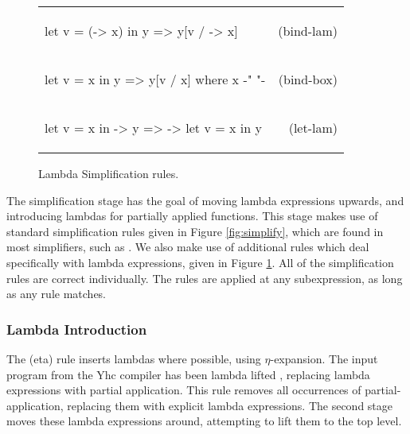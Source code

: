 \documentclass[preprint]{sigplanconf}
\newcommand{\simp}[2]{\vspace{-7mm} #2 & (#1) \\}
\newenvironment{simplify}
    {\noindent
     \begin{flushright}
     \begin{tabular}{p{6.5cm}r}
    }
    {\end{tabular}
     \vspace{-7mm}
     \end{flushright}
    }
\begin{document}
\begin{figure}
\begin{simplify}

\simp{bind-lam}{
\begin{code}
let v = (\w -> x) in y
    => y[v / \w -> x]
\end{code}}

\simp{bind-box}{
\begin{code}
let v = x in y
    => y[v / x]
    where x {-" \text{ is a boxed lambda (see \S\ref{sec:inlining})} "-}
\end{code}}

\simp{let-lam}{
\begin{code}
let v = x in \w -> y
    => \w -> let v = x in y
\end{code}}

\end{simplify}
\caption{Lambda Simplification rules.}
\label{fig:lambda_simplify}
\end{figure}

The simplification stage has the goal of moving lambda expressions upwards, and introducing lambdas for partially applied functions. This stage makes use of standard simplification rules given in Figure \ref{fig:simplify}, which are found in most simplifiers, such as \cite{spj:transformation}. We also make use of additional rules which deal specifically with lambda expressions, given in Figure \ref{fig:lambda_simplify}. All of the simplification rules are correct individually. The rules are applied at any subexpression, as long as any rule matches.

\subsubsection{Lambda Introduction}

The (eta) rule inserts lambdas where possible, using $\eta$-expansion. The input program from the Yhc compiler has been lambda lifted \cite{lambda_lift}, replacing lambda expressions with partial application. This rule removes all occurrences of partial-application, replacing them with explicit lambda expressions. The second stage moves these lambda expressions around, attempting to lift them to the top level.
\end{document}
